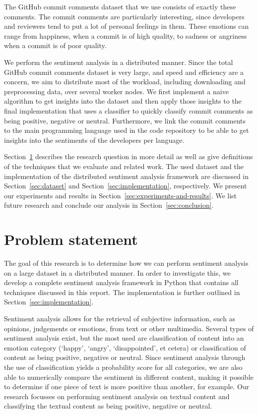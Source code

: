 \documentclass{article}
\begin{document}
The GitHub commit comments dataset that we use consists of exactly these 
comments. The commit comments are particularly interesting, since developers 
and reviewers tend to put a lot of personal feelings in them. These emotions 
can range from happiness, when a commit is of high quality, to sadness or 
angriness when a commit is of poor quality.

We perform the sentiment analysis in a distributed manner. Since the total 
GitHub commit comments dataset is very large, and speed and efficiency are 
a concern, we aim to distribute most of the workload, including downloading and 
preprocessing data, over several worker nodes. We first implement a naive 
algorithm to get insights into the dataset and then apply those insights to the 
final implementation that uses a classifier to quickly classify commit comments 
as being positive, negative or neutral. Furthermore, we link the commit 
comments to the main programming language used in the code repository to be 
able to get insights into the sentiments of the developers per language.

Section~\ref{sec:problem} describes the research question in more detail as well
as give definitions of the techniques that we evaluate and related work. The
used dataset and the implementation of the distributed sentiment analysis
framework are discussed in Section~\ref{sec:dataset} and
Section~\ref{sec:implementation}, respectively. We present our experiments and
results in Section~\ref{sec:experiments-and-results}. We list future research
and conclude our analysis in Section~\ref{sec:conclusion}.

\section{Problem statement}\label{sec:problem}
The goal of this research is to determine how we can perform sentiment analysis
on a large dataset in a distributed manner. In order to investigate this, we
develop a complete sentiment analysis framework in Python that contains all
techniques discussed in this report. The implementation is further outlined in 
Section~\ref{sec:implementation}.

Sentiment analysis allows for the retrieval of subjective information, such as
opinions, judgements or emotions, from text or other multimedia. Several types
of sentiment analysis exist, but the most used are classification of content
into an emotion category (`happy', `angry', `disappointed', et cetera) or
classification of content as being positive, negative or neutral. Since
sentiment analysis through the use of classification yields a probability score
for all categories, we are also able to numerically compare the sentiment in
different content, making it possible to determine if one piece of text is more
positive than another, for example. Our research focusses on performing 
sentiment analysis on textual content and classifying the textual content as 
being positive, negative or neutral.
\end{document}

